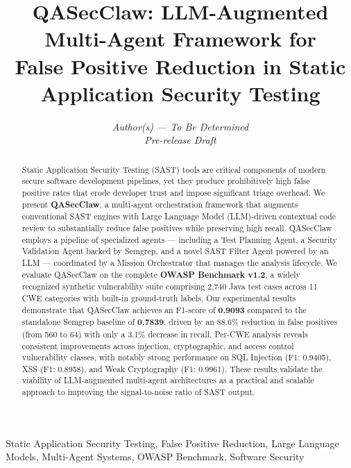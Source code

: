 \documentclass[conference]{IEEEtran}
\begin{document}
\title{QASecClaw: LLM-Augmented Multi-Agent Framework for\\ False Positive Reduction in Static Application Security Testing}

\author{
  \textit{Author(s) — To Be Determined}\\
  \textit{Pre-release Draft}
}

\maketitle

\begin{abstract}
Static Application Security Testing (SAST) tools are critical components of modern secure software development pipelines, yet they produce prohibitively high false positive rates that erode developer trust and impose significant triage overhead. We present \textbf{QASecClaw}, a multi-agent orchestration framework that augments conventional SAST engines with Large Language Model (LLM)-driven contextual code review to substantially reduce false positives while preserving high recall. QASecClaw employs a pipeline of specialized agents — including a Test Planning Agent, a Security Validation Agent backed by Semgrep, and a novel SAST Filter Agent powered by an LLM — coordinated by a Mission Orchestrator that manages the analysis lifecycle. We evaluate QASecClaw on the complete \textbf{OWASP Benchmark v1.2}, a widely recognized synthetic vulnerability suite comprising 2,740 Java test cases across 11 CWE categories with built-in ground-truth labels. Our experimental results demonstrate that QASecClaw achieves an F1-score of \textbf{0.9093} compared to the standalone Semgrep baseline of \textbf{0.7839}, driven by an 88.6\% reduction in false positives (from 560 to 64) with only a 3.1\% decrease in recall. Per-CWE analysis reveals consistent improvements across injection, cryptographic, and access control vulnerability classes, with notably strong performance on SQL Injection (F1: 0.9405), XSS (F1: 0.8958), and Weak Cryptography (F1: 0.9961). These results validate the viability of LLM-augmented multi-agent architectures as a practical and scalable approach to improving the signal-to-noise ratio of SAST output.
\end{abstract}

\begin{IEEEkeywords}
Static Application Security Testing, False Positive Reduction, Large Language Models, Multi-Agent Systems, OWASP Benchmark, Software Security
\end{IEEEkeywords}
\end{document}
